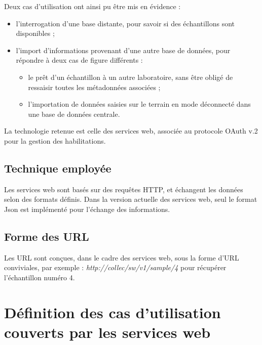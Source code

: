Deux cas d'utilisation ont ainsi pu être mis en évidence :
\begin{itemize}
\item l'interrogation d'une base distante, pour savoir si des échantillons sont disponibles ;
\item l'import d'informations provenant d'une autre base de données, pour ré\-pondre à deux cas de figure différents :
\begin{itemize}
\item le prêt d'un échantillon à un autre laboratoire, sans être obligé de ressaisir toutes les métadonnées associées ;
\item l'importation de données saisies sur le terrain en mode déconnecté dans une base de données centrale.
\end{itemize}
\end{itemize}

La technologie retenue est celle des services web, associée au protocole OAuth v.2 pour la gestion des habilitations.

\subsection{Technique employée}

Les services web sont basés sur des requêtes HTTP, et échangent les données selon des formats définis. Dans la version actuelle des services web, seul le format Json est implémenté pour l'échange des informations.

\subsection{Forme des URL}
Les URL sont conçues, dans le cadre des services web, sous la forme d'URL conviviales, par exemple : \textit{http://collec/sw/v1/sample/4} pour récupérer l'échan\-tillon numéro 4.

\section{Définition des cas d'utilisation couverts par les services web}

